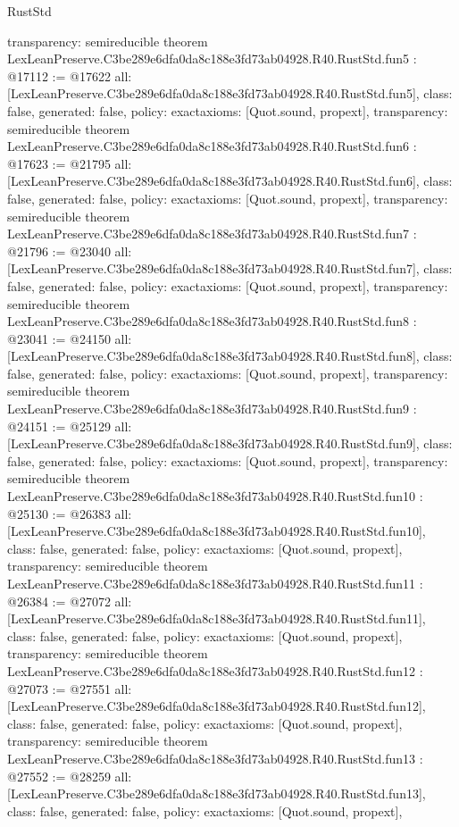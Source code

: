 \begin{lexlean}{RustStd}
\begin{coremodule}
{  transparency: semireducible
}
theorem LexLeanPreserve.C3be289e6dfa0da8c188e3fd73ab04928.R40.RustStd.fun5 : @17112 := @17622 {
  all: [LexLeanPreserve.C3be289e6dfa0da8c188e3fd73ab04928.R40.RustStd.fun5],
  class: false,
  generated: false,
  policy: exact{axioms: [Quot.sound, propext]},
  transparency: semireducible
}
theorem LexLeanPreserve.C3be289e6dfa0da8c188e3fd73ab04928.R40.RustStd.fun6 : @17623 := @21795 {
  all: [LexLeanPreserve.C3be289e6dfa0da8c188e3fd73ab04928.R40.RustStd.fun6],
  class: false,
  generated: false,
  policy: exact{axioms: [Quot.sound, propext]},
  transparency: semireducible
}
theorem LexLeanPreserve.C3be289e6dfa0da8c188e3fd73ab04928.R40.RustStd.fun7 : @21796 := @23040 {
  all: [LexLeanPreserve.C3be289e6dfa0da8c188e3fd73ab04928.R40.RustStd.fun7],
  class: false,
  generated: false,
  policy: exact{axioms: [Quot.sound, propext]},
  transparency: semireducible
}
theorem LexLeanPreserve.C3be289e6dfa0da8c188e3fd73ab04928.R40.RustStd.fun8 : @23041 := @24150 {
  all: [LexLeanPreserve.C3be289e6dfa0da8c188e3fd73ab04928.R40.RustStd.fun8],
  class: false,
  generated: false,
  policy: exact{axioms: [Quot.sound, propext]},
  transparency: semireducible
}
theorem LexLeanPreserve.C3be289e6dfa0da8c188e3fd73ab04928.R40.RustStd.fun9 : @24151 := @25129 {
  all: [LexLeanPreserve.C3be289e6dfa0da8c188e3fd73ab04928.R40.RustStd.fun9],
  class: false,
  generated: false,
  policy: exact{axioms: [Quot.sound, propext]},
  transparency: semireducible
}
theorem LexLeanPreserve.C3be289e6dfa0da8c188e3fd73ab04928.R40.RustStd.fun10 : @25130 := @26383 {
  all: [LexLeanPreserve.C3be289e6dfa0da8c188e3fd73ab04928.R40.RustStd.fun10],
  class: false,
  generated: false,
  policy: exact{axioms: [Quot.sound, propext]},
  transparency: semireducible
}
theorem LexLeanPreserve.C3be289e6dfa0da8c188e3fd73ab04928.R40.RustStd.fun11 : @26384 := @27072 {
  all: [LexLeanPreserve.C3be289e6dfa0da8c188e3fd73ab04928.R40.RustStd.fun11],
  class: false,
  generated: false,
  policy: exact{axioms: [Quot.sound, propext]},
  transparency: semireducible
}
theorem LexLeanPreserve.C3be289e6dfa0da8c188e3fd73ab04928.R40.RustStd.fun12 : @27073 := @27551 {
  all: [LexLeanPreserve.C3be289e6dfa0da8c188e3fd73ab04928.R40.RustStd.fun12],
  class: false,
  generated: false,
  policy: exact{axioms: [Quot.sound, propext]},
  transparency: semireducible
}
theorem LexLeanPreserve.C3be289e6dfa0da8c188e3fd73ab04928.R40.RustStd.fun13 : @27552 := @28259 {
  all: [LexLeanPreserve.C3be289e6dfa0da8c188e3fd73ab04928.R40.RustStd.fun13],
  class: false,
  generated: false,
  policy: exact{axioms: [Quot.sound, propext]},
}
\end{coremodule}
\end{lexlean}
